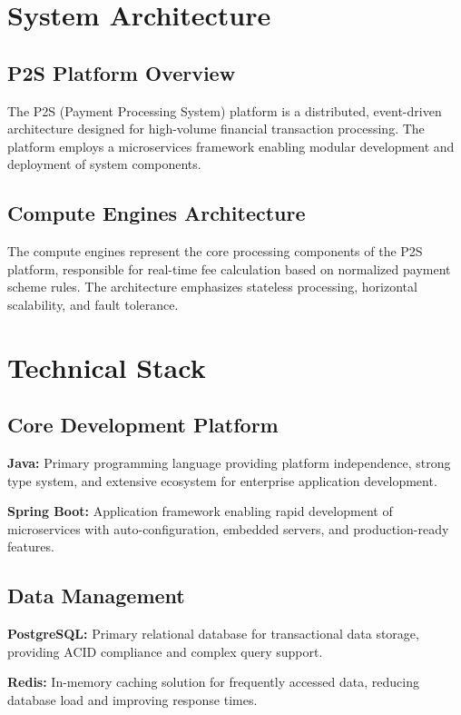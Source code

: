\section{System Architecture}

\subsection{P2S Platform Overview}

The P2S (Payment Processing System) platform is a distributed, event-driven architecture designed for high-volume financial transaction processing. The platform employs a microservices framework enabling modular development and deployment of system components.

\subsection{Compute Engines Architecture}

The compute engines represent the core processing components of the P2S platform, responsible for real-time fee calculation based on normalized payment scheme rules. The architecture emphasizes stateless processing, horizontal scalability, and fault tolerance.

\section{Technical Stack}

\subsection{Core Development Platform}

\textbf{Java:} Primary programming language providing platform independence, strong type system, and extensive ecosystem for enterprise application development.

\textbf{Spring Boot:} Application framework enabling rapid development of microservices with auto-configuration, embedded servers, and production-ready features.

\subsection{Data Management}

\textbf{PostgreSQL:} Primary relational database for transactional data storage, providing ACID compliance and complex query support.

\textbf{Redis:} In-memory caching solution for frequently accessed data, reducing database load and improving response times.

